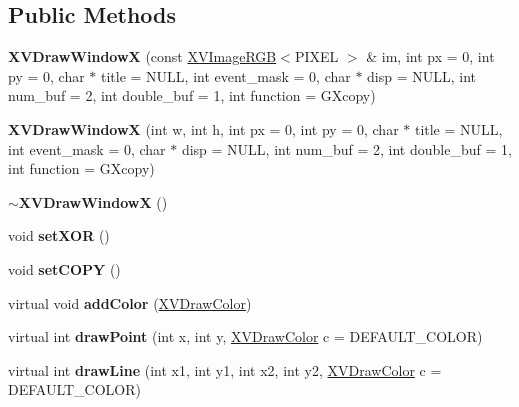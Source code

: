 \subsection*{Public Methods}
\begin{CompactItemize}
\item 
\label{XVDrawWindowX_a0}
\hypertarget{class_XVDrawWindowX_a0}{
{\bf XVDraw\-Window\-X} (const \hyperlink{class_XVImageRGB}{XVImage\-RGB}$<$PIXEL $>$ \& im, int px = 0, int py = 0, char $\ast$ title = NULL, int event\_\-mask = 0, char $\ast$ disp = NULL, int num\_\-buf = 2, int double\_\-buf = 1, int function = GXcopy)}

\item 
\label{XVDrawWindowX_a1}
\hypertarget{class_XVDrawWindowX_a1}{
{\bf XVDraw\-Window\-X} (int w, int h, int px = 0, int py = 0, char $\ast$ title = NULL, int event\_\-mask = 0, char $\ast$ disp = NULL, int num\_\-buf = 2, int double\_\-buf = 1, int function = GXcopy)}

\item 
\label{XVDrawWindowX_a2}
\hypertarget{class_XVDrawWindowX_a2}{
{\bf $\sim$XVDraw\-Window\-X} ()}

\item 
void {\bf set\-XOR} ()
\item 
void {\bf set\-COPY} ()
\item 
\label{XVDrawWindowX_a5}
\hypertarget{class_XVDrawWindowX_a5}{
virtual void {\bf add\-Color} (\hyperlink{class_XVDrawColor}{XVDraw\-Color})}

\item 
\label{XVDrawWindowX_a6}
\hypertarget{class_XVDrawWindowX_a6}{
virtual int {\bf draw\-Point} (int x, int y, \hyperlink{class_XVDrawColor}{XVDraw\-Color} c = DEFAULT\_\-COLOR)}

\item 
\label{XVDrawWindowX_a7}
\hypertarget{class_XVDrawWindowX_a7}{
virtual int {\bf draw\-Line} (int x1, int y1, int x2, int y2, \hyperlink{class_XVDrawColor}{XVDraw\-Color} c = DEFAULT\_\-COLOR)}


\end{CompactItemize}
